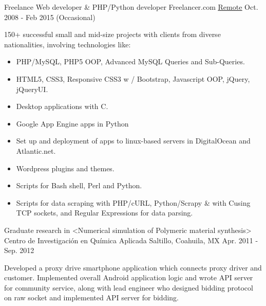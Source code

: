 \begin{cventries}

\cventry
{Freelance Web developer \& PHP/Python developer} %
{Freelancer.com} %
{\href{https://freelancer.com/u/DraKkareS.html}{\underline{Remote}}} %
{Oct. 2008 - Feb 2015 (Occasional)} %
{ %
	\begin{cvitems}
		\item {150+ successful small and mid-size projects with clients from diverse nationalities, involving technologies like:
		\begin{itemize}
			\item {PHP/MySQL, PHP5 OOP, Advanced MySQL Queries and Sub-Queries.}
			\item {HTML5, CSS3, Responsive CSS3 w / Bootstrap, Javascript OOP, jQuery, jQueryUI.}
			\item {Desktop applications with C\@sharp.}
			\item {Google App Engine apps in Python}
			\item {Set up and deployment of apps to linux-based servers in DigitalOcean and Atlantic.net.}
			\item {Wordpress plugins and themes.}
			\item {Scripts for Bash shell, Perl and Python.}
			\item {Scripts for data scraping with PHP/cURL, Python/Scrapy \& with C\@sharp using TCP sockets, and Regular Expressions for data parsing.}
		\end{itemize}	
	}	
	\end{cvitems}
}


\cventry
{Graduate research in <Numerical simulation of Polymeric material synthesis>} %
{Centro de Investigación en Química Aplicada} %
{Saltillo, Coahuila, MX} %
{Apr. 2011 - Sep. 2012} %
{ %
	\begin{cvitems}
	\item {Developed a proxy drive smartphone application which connects proxy driver and customer. Implemented overall Android application logic and wrote API server for community service, along with lead engineer who designed bidding protocol on raw socket and implemented API server for bidding.}
	\end{cvitems}
}



\end{cventries}
